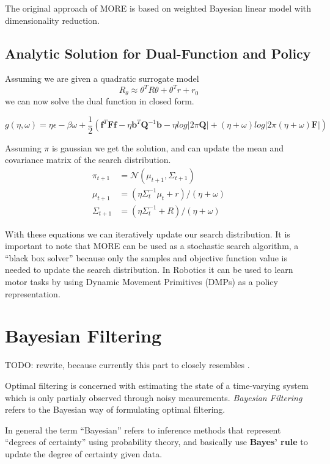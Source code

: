 The original approach of MORE is based on weighted Bayesian linear model with
dimensionality reduction.

\subsection{Analytic Solution for Dual-Function and Policy}
Assuming we are given a quadratic surrogate model
$$ R_\theta \approx \theta^T R \theta + \theta^T r + r_0 $$
we can now solve the dual function in closed form.

$$ g(\eta, \omega) = \eta \epsilon - \beta \omega
+ \frac{1}{2} \left(\mathbf{f}^T \mathbf{F} \mathbf{f} - \eta \mathbf{b}^T \mathbf{Q}^{-1}
\mathbf{b} - \eta log |2\pi \mathbf{Q}| + (\eta + \omega) log |2\pi (\eta + \omega)
\mathbf{F}| \right) $$

Assuming $\pi$ is gaussian we get the solution, and can update the mean and covariance matrix
of the search distribution. 
\begin{align} \label{policy_update}
  \pi_{t+1} &= \mathcal{N}(\mu_{t+1}, \Sigma_{t+1}) \\
  \mu_{t+1} &= (\eta \Sigma_{t}^{-1}\mu_t + r) / (\eta + \omega) \\
  \Sigma_{t+1} &= (\eta \Sigma_t^{-1} + R) / (\eta + \omega)
\end{align}

With these equations we can iteratively update our search distribution.
It is important to note that MORE can be used as a stochastic search algorithm,
a ``black box solver'' because only the samples and objective function value
is needed to update the search distribution.
In Robotics it can be used to learn motor tasks by using Dynamic Movement Primitives
(DMPs) as a policy representation.

\section{Bayesian Filtering}

TODO:  rewrite, because currently this part to closely resembles \citet{sarkka2013bayesian}.

Optimal filtering is concerned with estimating the state of a time-varying system
which is only partialy observed through noisy meaurements.
\textit{Bayesian Filtering} refers to the Bayesian way of formulating optimal
filtering.

In general the term ``Bayesian'' refers to inference methods that represent
``degrees of certainty'' using probability theory, and basically use \textbf{Bayes' rule}
to update the degree of certainty given data.

